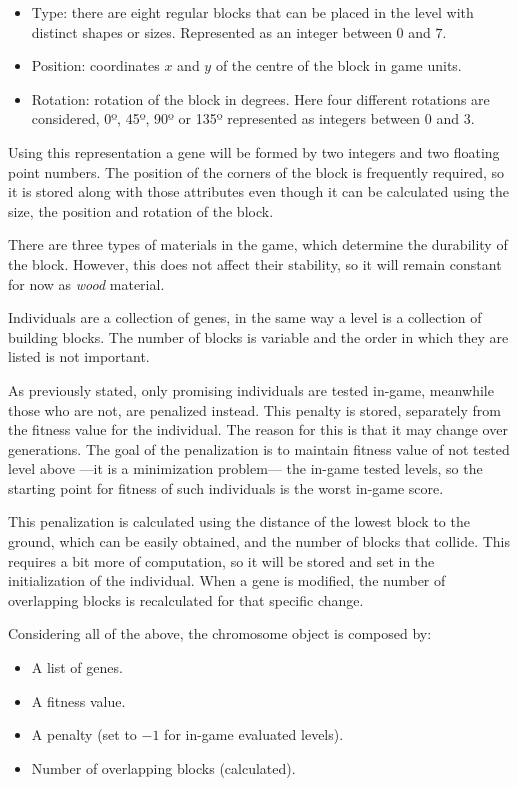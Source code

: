 \begin{itemize}
	\item Type: there are eight regular blocks that can be placed in the level with distinct shapes or sizes. Represented as an integer between $0$ and $7$.
	\item Position: coordinates $x$ and $y$ of the centre of the block in game units.
	\item Rotation: rotation of the block in degrees. Here four different rotations are considered, 0º, 45º, 90º or 135º represented as integers between $0$ and $3$.
\end{itemize}

Using this representation a gene will be formed by two integers and two floating point numbers.
The position of the corners of the block is frequently required, so it is stored along with those attributes even though it can be calculated using the size, the position and rotation of the block. 

There are three types of materials in the game, which determine the durability of the block. However, this does not affect their stability, so it will remain constant for now as \textit{wood} material.

Individuals are a collection of genes, in the same way a level is a collection of building blocks. The number of blocks is variable and the order in which they are listed is not important. 

As previously stated, only promising individuals are tested in-game, meanwhile those who are not, are penalized instead. This penalty is stored, separately from the fitness value for the individual. The reason for this is that it may change over generations. The goal of the penalization is to maintain fitness value of not tested level above ---it is a minimization problem--- the in-game tested levels, so the starting point for fitness of such individuals is the worst in-game score.

This penalization is calculated using the distance of the lowest block to the ground, which can be easily obtained, and the number of blocks that collide. This requires a bit more of computation, so it will be stored and set in the initialization of the individual. When a gene is modified, the number of overlapping blocks is recalculated for that specific change.

Considering all of the above, the chromosome object is composed by:
\begin{itemize}
	\item A list of genes.
	\item A fitness value.
	\item A penalty (set to $-1$ for in-game evaluated levels).
	\item Number of overlapping blocks (calculated).
\end{itemize}

